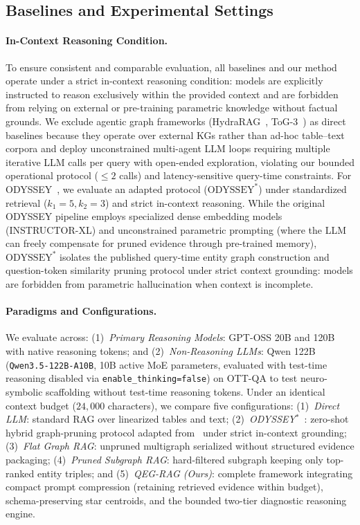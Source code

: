 \documentclass[runningheads]{llncs}
\begin{document}
\subsection{Baselines and Experimental Settings}
\paragraph{In-Context Reasoning Condition.}
To ensure consistent and comparable evaluation, all baselines and our method operate under a strict in-context reasoning condition: models are explicitly instructed to reason exclusively within the provided context and are forbidden from relying on external or pre-training parametric knowledge without factual grounds. We exclude agentic graph frameworks (HydraRAG~\cite{tan2025hydrarag}, ToG-3~\cite{wu2025tog3}) as direct baselines because they operate over external KGs rather than ad-hoc table--text corpora and deploy unconstrained multi-agent LLM loops requiring multiple iterative LLM calls per query with open-ended exploration, violating our bounded operational protocol ($\le 2$ calls) and latency-sensitive query-time constraints. For ODYSSEY~\cite{agarwal2025hybrid}, we evaluate an adapted protocol ($\text{ODYSSEY}^*$) under standardized retrieval ($k_1=5, k_2=3$) and strict in-context reasoning. While the original ODYSSEY pipeline employs specialized dense embedding models (INSTRUCTOR-XL) and unconstrained parametric prompting (where the LLM can freely compensate for pruned evidence through pre-trained memory), $\text{ODYSSEY}^*$ isolates the published query-time entity graph construction and question-token similarity pruning protocol under strict context grounding: models are forbidden from parametric hallucination when context is incomplete.

\paragraph{Paradigms and Configurations.}
We evaluate across: (1)~\emph{Primary Reasoning Models}: GPT-OSS 20B and 120B with native reasoning tokens; and (2)~\emph{Non-Reasoning LLMs}: Qwen 122B (\texttt{Qwen3.5-122B-A10B}, 10B active MoE parameters, evaluated with test-time reasoning disabled via \texttt{enable\_thinking=false}) on OTT-QA to test neuro-symbolic scaffolding without test-time reasoning tokens.
Under an identical context budget ($24{,}000$ characters), we compare five configurations:
(1)~\emph{Direct LLM}: standard RAG over linearized tables and text;
(2)~\emph{ODYSSEY$^*$}~\cite{agarwal2025hybrid}: zero-shot hybrid graph-pruning protocol adapted from~\cite{agarwal2025hybrid} under strict in-context grounding;
(3)~\emph{Flat Graph RAG}: unpruned multigraph serialized without structured evidence packaging;
(4)~\emph{Pruned Subgraph RAG}: hard-filtered subgraph keeping only top-ranked entity triples; and
(5)~\emph{QEG-RAG (Ours)}: complete framework integrating compact prompt compression (retaining retrieved evidence within budget), schema-preserving star centroids, and the bounded two-tier diagnostic reasoning engine.
\end{document}

